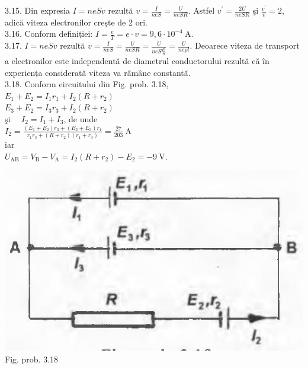 3.15. Din expresia $I=n e S v$ rezultă $v=\frac{I}{n e S}=\frac{U}{n e S R}$. Astfel $v^{\prime}=\frac{2 U}{n e S R}$ şi $\frac{v^{\prime}}{v}=2$, adică viteza electronilor creşte de 2 ori.\\

3.16. Conform definiției: $I=\frac{e}{T}=e \cdot v=9,6 \cdot 10^{-4} \mathrm{~A}$.\\

3.17. $I=n e S v$ rezultă $v=\frac{I}{n e S}=\frac{U}{n e S R}=\frac{U}{n e S \frac{\rho l}{S}}=\frac{U}{n e \rho l}$. Deoarece viteza de transport a electronilor este independentă de diametrul conductorului rezultă că în experiența considerată viteza va rămâne constantă.\\

3.18. Conform circuitului din Fig. prob. 3.18,\\ $E_{1}+E_{2}=I_{1} r_{1}+I_{2}\left(R+r_{2}\right)$\\ $E_{3}+E_{2}=I_{3} r_{3}+I_{2}\left(R+r_{2}\right)$\\ şi $\quad I_{2}=I_{1}+I_{3}$, de unde\\ $I_{2}=\frac{\left(E_{1}+E_{2}\right) r_{3}+\left(E_{2}+E_{3}\right) r_{1}}{r_{1} r_{3}+\left(R+r_{2}\right)\left(r_{1}+r_{3}\right)}=\frac{27}{203} \mathrm{~A}$\\ iar\\ $U_{\mathrm{AB}}=V_{\mathrm{B}}-V_{\mathrm{A}}=I_{2}\left(R+r_{2}\right)-E_{2}=-9 \mathrm{~V}$.\\ \begin{center} \includegraphics[max width=\textwidth]{images/2025_07_01_5b3ff9fa0d508c8e9f17g-344}\\ Fig. prob. 3.18 \end{center}\\

